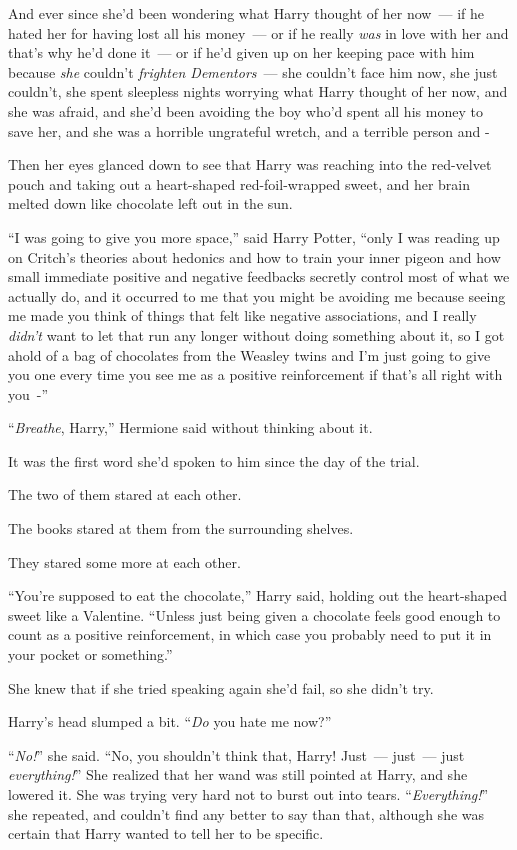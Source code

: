 And ever since she'd been wondering what Harry thought of her now~--- if he hated her for having lost all his money~--- or if he really \emph{was} in love with her and that's why he'd done it~--- or if he'd given up on her keeping pace with him because \emph{she} couldn't \emph{frighten Dementors}~--- she couldn't face him now, she just couldn't, she spent sleepless nights worrying what Harry thought of her now, and she was afraid, and she'd been avoiding the boy who'd spent all his money to save her, and she was a horrible ungrateful wretch, and a terrible person and -

Then her eyes glanced down to see that Harry was reaching into the red-velvet pouch and taking out a heart-shaped red-foil-wrapped sweet, and her brain melted down like chocolate left out in the sun.

``I was going to give you more space,'' said Harry Potter, ``only I was reading up on Critch's theories about hedonics and how to train your inner pigeon and how small immediate positive and negative feedbacks secretly control most of what we actually do, and it occurred to me that you might be avoiding me because seeing me made you think of things that felt like negative associations, and I really \emph{didn't} want to let that run any longer without doing something about it, so I got ahold of a bag of chocolates from the Weasley twins and I'm just going to give you one every time you see me as a positive reinforcement if that's all right with you~-''

``\emph{Breathe}, Harry,'' Hermione said without thinking about it.

It was the first word she'd spoken to him since the day of the trial.

The two of them stared at each other.

The books stared at them from the surrounding shelves.

They stared some more at each other.

``You're supposed to eat the chocolate,'' Harry said, holding out the heart-shaped sweet like a Valentine. ``Unless just being given a chocolate feels good enough to count as a positive reinforcement, in which case you probably need to put it in your pocket or something.''

She knew that if she tried speaking again she'd fail, so she didn't try.

Harry's head slumped a bit. ``\emph{Do} you hate me now?''

``\emph{No!}'' she said. ``No, you shouldn't think that, Harry! Just~--- just~--- just \emph{everything!}'' She realized that her wand was still pointed at Harry, and she lowered it. She was trying very hard not to burst out into tears. ``\emph{Everything!}'' she repeated, and couldn't find any better to say than that, although she was certain that Harry wanted to tell her to be specific.

